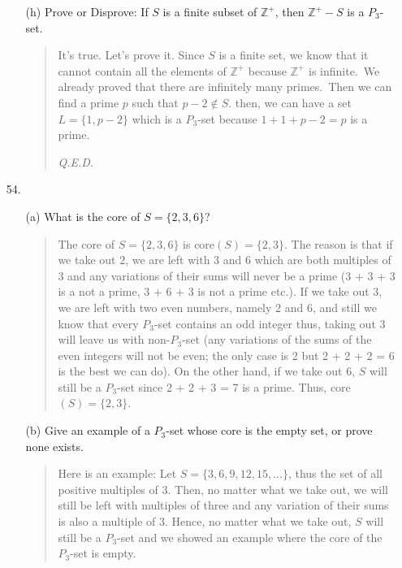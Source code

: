 \documentclass[12pt, a4paper]{article}                      %
\begin{document}
\begin{itemize}
\begin{itemize}
\item[]

\item[(h)]
Prove or Disprove: If $S$ is a finite subset of $\mathbb{Z}^+$, then $\mathbb{Z}^+ - S$ is a $P_3$-set.
\begin{quote}
It's true. Let's prove it. Since $S$ is a finite set, we know that it cannot contain all the elements of $\mathbb{Z}^+$ because $\mathbb{Z}^+$ is infinite.\ We already proved that there are infinitely many primes.\ Then we can find a prime $p$ such that $p - 2 \notin S$.
then, we can have a set $L = \{1, p - 2\}$ which is a $P_3$-set because $1 + 1 + p - 2 = p$ is a prime.
\begin{flushright}
\textit{Q.E.D.}
\end{flushright}
\end{quote}
\end{itemize}

\item[]
\item[]

\item[54.]
\begin{itemize}
If a subset $S$ of $\mathbb{Z}^+$ is a $P_3$-set then the \textbf{core} of $S$ is the set
$$\mbox{core}(S) := \{s \in S \mid S - \{s\} \mbox{ is not a $P_3$-set}\}.$$

\item[]

\item[(a)]
What is the core of $S = \{2, 3, 6\}$?
\begin{quote}
The core of $S = \{2, 3, 6\}$ is core$(S) = \{2, 3\}$.
The reason is that if we take out $2$, we are left with 3 and 6 which are both multiples of 3 and any variations of their sums will never be a prime (3 + 3 + 3 is a not a prime, 3 + 6 + 3 is not a prime etc.).
If we take out 3, we are left with two even numbers, namely 2 and 6, and still we know that every $P_3$-set contains an odd integer thus, taking out 3 will leave us with non-$P_3$-set (any variations of the sums of the even integers will not be even; the only case is 2 but 2 + 2 + 2 = 6 is the best we can do). On the other hand, if we take out 6, $S$ will still be a $P_3$-set since 2 + 2 + 3 = 7 is a prime.
Thus, core$(S) = \{2, 3\}$.
\end{quote}

\item[]

\item[(b)]
Give an example of a $P_3$-set whose core is the empty set, or prove none exists.
\begin{quote}
Here is an example: Let $S = \{3, 6, 9, 12, 15, ...\}$, thus the set of all positive
multiples of 3. Then, no matter what we take out, we will still be left with multiples
of three and any variation of their sums is also a multiple of 3. Hence, no matter what
we take out, $S$ will still be a $P_3$-set and we showed an example where the core of the
$P_3$-set is empty.
\end{quote}


\end{itemize}
\end{itemize}
\end{document}
